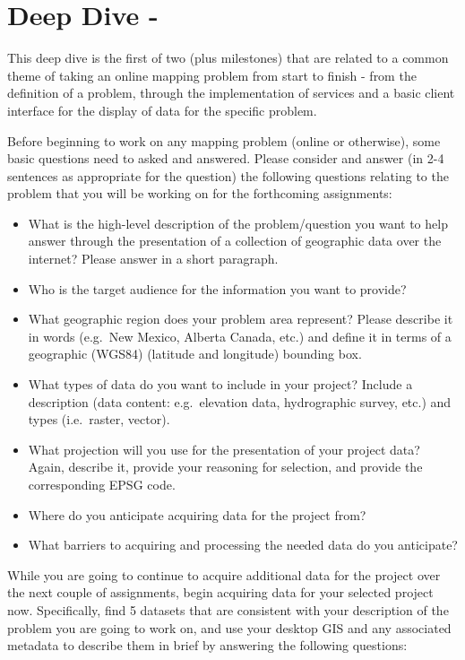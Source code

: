 \documentclass[]{book}
\begin{document}
\section{Deep Dive -}\label{week11-deepDive}

This deep dive is the first of two (plus milestones) that are related to
a common theme of taking an online mapping problem from start to finish
- from the definition of a problem, through the implementation of
services and a basic client interface for the display of data for the
specific problem.

Before beginning to work on any mapping problem (online or otherwise),
some basic questions need to asked and answered. Please consider and
answer (in 2-4 sentences as appropriate for the question) the following
questions relating to the problem that you will be working on for the
forthcoming assignments:

\begin{itemize}
\item
  What is the high-level description of the problem/question you want to
  help answer through the presentation of a collection of geographic
  data over the internet? Please answer in a short paragraph.
\item
  Who is the target audience for the information you want to provide?
\item
  What geographic region does your problem area represent? Please
  describe it in words (e.g.~New Mexico, Alberta Canada, etc.) and
  define it in terms of a geographic (WGS84) (latitude and longitude)
  bounding box.
\item
  What types of data do you want to include in your project? Include a
  description (data content: e.g.~elevation data, hydrographic survey,
  etc.) and types (i.e.~raster, vector).
\item
  What projection will you use for the presentation of your project
  data? Again, describe it, provide your reasoning for selection, and
  provide the corresponding EPSG code.
\item
  Where do you anticipate acquiring data for the project from?
\item
  What barriers to acquiring and processing the needed data do you
  anticipate?
\end{itemize}

While you are going to continue to acquire additional data for the
project over the next couple of assignments, begin acquiring data for
your selected project now. Specifically, find 5 datasets that are
consistent with your description of the problem you are going to work
on, and use your desktop GIS and any associated metadata to describe
them in brief by answering the following questions:
\end{document}
